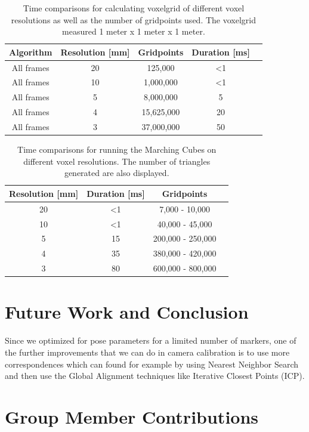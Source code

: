 \documentclass[10pt,twocolumn,letterpaper]{article}
\begin{document}
\begin{table}[h!]
  \begin{center}
    \begin{tabular}{c|c|c|c p{4cm}}
      \textbf{Algorithm} & \textbf{Resolution [mm]} & \textbf{Gridpoints} & \textbf{Duration [ms]}\\
      \hline
      All frames & 20 & 125,000 & \textless 1\\
      All frames & 10 & 1,000,000 & \textless 1\\
      All frames & 5 & 8,000,000 & 5\\
      All frames & 4 & 15,625,000 & 20\\
      All frames & 3 & 37,000,000 & 50\\
    \end{tabular}
     \caption{Time comparisons for calculating voxelgrid of different voxel resolutions as well as the number of gridpoints used. The voxelgrid measured 1 meter x 1 meter x 1 meter.}
     \label{tab:table2}
  \end{center}
\end{table}

\begin{table}[h!]
  \begin{center}
    \begin{tabular}{c|c|c p{4cm}}
      \textbf{Resolution [mm]} & \textbf{Duration [ms]} & \textbf{Gridpoints}\\
      \hline
      20 & \textless 1 & 7,000 - 10,000\\
      10 & \textless 1 & 40,000 - 45,000\\
      5 & 15 & 200,000 - 250,000\\
      4 & 35 & 380,000 - 420,000\\
      3 & 80 & 600,000 - 800,000\\
    \end{tabular}
     \caption{Time comparisons for running the Marching Cubes on different voxel resolutions. The number of triangles generated are also displayed.}
     \label{tab:table3}
  \end{center}
\end{table}

\section{Future Work and Conclusion}
Since we optimized for pose parameters for a limited number of markers, one of the further improvements that we can do in camera calibration is to use more correspondences which can found for example by using Nearest Neighbor Search and then use the Global Alignment techniques like Iterative Closest Points (ICP).

\section{Group Member Contributions}

{\small


}
\end{document}
